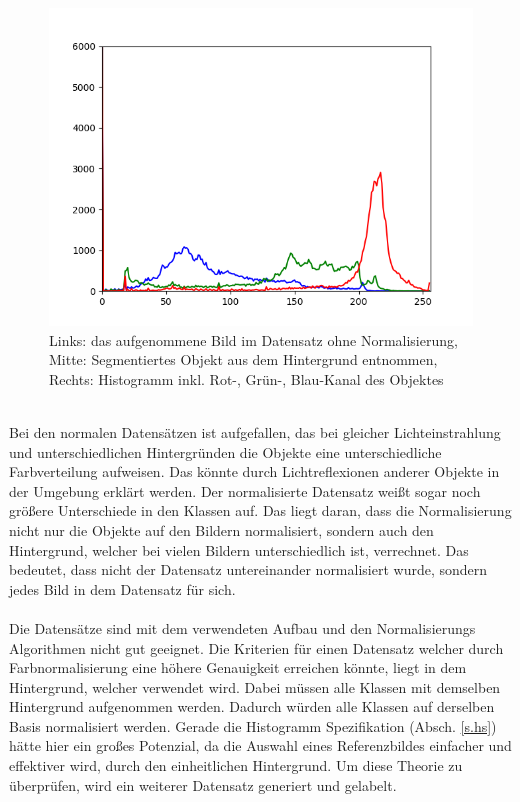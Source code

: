 \documentclass[a4paper,12pt,oneside]{article}
\begin{document}
\begin{figure}[htb]
\begin{minipage}[c]{0.08\textwidth}
\end{minipage}
\hfill
\begin{minipage}[c]{0.3\textwidth}
\includegraphics[width=\textwidth]{Sources/Bild2_histo.png}
\end{minipage}
\label{img:evalnorm}
\caption{Links: das aufgenommene Bild im Datensatz ohne Normalisierung, Mitte: Segmentiertes Objekt aus dem Hintergrund entnommen, Rechts: Histogramm inkl. Rot-, Grün-, Blau-Kanal des Objektes}
\end{figure}\\
Bei den normalen Datensätzen ist aufgefallen, das bei gleicher Lichteinstrahlung und unterschiedlichen Hintergründen die Objekte eine unterschiedliche Farbverteilung aufweisen. Das könnte durch Lichtreflexionen anderer Objekte in der Umgebung erklärt werden. Der normalisierte Datensatz weißt sogar noch größere Unterschiede in den Klassen auf. Das liegt daran, dass die Normalisierung nicht nur die Objekte auf den Bildern normalisiert, sondern auch den Hintergrund, welcher bei vielen Bildern unterschiedlich ist, verrechnet. Das bedeutet, dass nicht der Datensatz untereinander normalisiert wurde, sondern jedes Bild in dem Datensatz für sich.\\\\
Die Datensätze sind mit dem verwendeten Aufbau und den Normalisierungs Algorithmen nicht gut geeignet. Die Kriterien für einen Datensatz welcher durch Farbnormalisierung eine höhere Genauigkeit erreichen könnte, liegt in dem Hintergrund, welcher verwendet wird. Dabei müssen alle Klassen mit demselben Hintergrund aufgenommen werden. Dadurch würden alle Klassen auf derselben Basis normalisiert werden. Gerade die Histogramm Spezifikation (Absch. \ref{s.hs}) hätte hier ein großes Potenzial, da die Auswahl eines Referenzbildes einfacher und effektiver wird, durch den einheitlichen Hintergrund. Um diese Theorie zu überprüfen, wird ein weiterer Datensatz generiert und gelabelt. 
\end{document}
